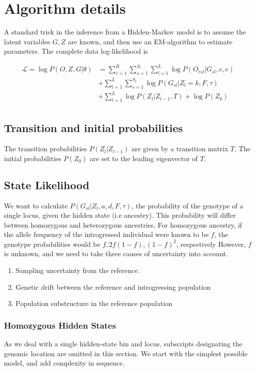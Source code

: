 \documentclass[10pt,a4paper]{article}
\begin{document}
\section{Algorithm details}
A standard trick in the inference from a Hidden-Markov model is to assume the latent variables $G, Z$ are known, and then use an EM-algorithm to estimate parameters. The complete data log-likelihood is

\begin{align}
\mathcal{L}  = \log P(O, Z, G | \theta) &= \sum_{r=1}^R\sum_{s=1}^{S_l}\sum_{l=1}^L \log P(O_{rsl} | G_{sl}, c, e)\nonumber\\
&+ \sum_{l=1}^L \sum_{s=1}^{S_l} \log P(G_{sl} | Z_l = k, F, \tau)\nonumber\\
&+ \sum_{l=1}^L  \log P(Z_l |Z_{l-1}, T) +\log P(Z_0) \nonumber\\
\label{eq:ll:correct}
\end{align}


\subsection*{Transition and initial probabilities}
The transition probabilities $P(Z_l|Z_{l-1})$ are given by a transition matrix $T$. The initial probabilities $P(Z_0)$ are set to the leading eigenvector of $T$.
\subsection{State Likelihood}
We want to calculate $P(G_{sl}|Z_l, a, d, F, \tau)$, the probability of the genotype of a single locus, given the hidden state (i.e ancestry). This probability will differ between homozygous and heterozygous ancestries. For homozygous ancestry, if the allele frequency of the introgressed individual were known to be $f$, the genotype probabilities would be $f, 2f(1-f), (1-f)^2$, respectively However, $f$ is unknown, and we need to take three causes of uncertainty into account.
\begin{enumerate}
	\item Sampling uncertainty from the reference.	
	\item Genetic drift between the reference and introgressing population
	\item Population substructure in the reference population
\end{enumerate}


\subsubsection{Homozygous Hidden States}
As we deal with a single hidden-state bin and locus, subscripts designating the genomic location are omitted in this section. We start with the simplest possible model, and add complexity in sequence.
\end{document}
